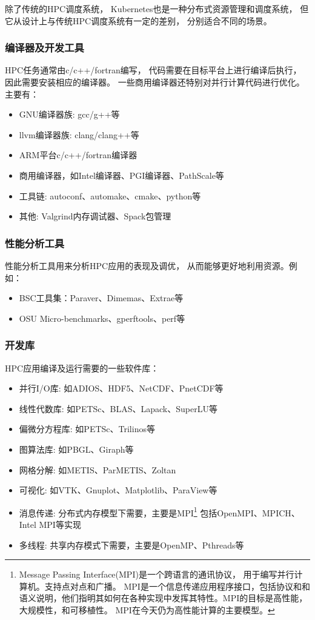 除了传统的HPC调度系统，
Kubernetes也是一种分布式资源管理和调度系统，
但它从设计上与传统HPC调度系统有一定的差别，
分别适合不同的场景\cite{choose_k8s_lsf}。

\subsubsection{编译器及开发工具}
HPC任务通常由c/c++/fortran编写，
代码需要在目标平台上进行编译后执行，
因此需要安装相应的编译器。
一些商用编译器还特别对并行计算代码进行优化。
主要有：

\begin{itemize}
    \item GNU编译器族: gcc/g++等
    \item llvm编译器族: clang/clang++等
    \item ARM平台c/c++/fortran编译器\cite{arm_hpc_tools}
    \item 商用编译器，如Intel编译器、PGI编译器、PathScale等 
    \item 工具链: autoconf、automake、cmake、python等 
    \item 其他: Valgrind内存调试器、Spack包管理
\end{itemize}

\subsubsection{性能分析工具}
性能分析工具用来分析HPC应用的表现及调优，
从而能够更好地利用资源。例如：

\begin{itemize}
    \item BSC工具集：Paraver、Dimemas、Extrae等
    \item OSU Micro-benchmarks、gperftools、perf等
\end{itemize}

\subsubsection{开发库}
HPC应用编译及运行需要的一些软件库：

\begin{itemize}
    \item 并行I/O库: 如ADIOS、HDF5、NetCDF、PnetCDF等
    \item 线性代数库: 如PETSc、BLAS、Lapack、SuperLU等
    \item 偏微分方程库: 如PETSc、Trilinos等
    \item 图算法库: 如PBGL、Giraph等
    \item 网格分解: 如METIS、ParMETIS、Zoltan
    \item 可视化: 如VTK、Gnuplot、Matplotlib、ParaView等
    \item 消息传递: 分布式内存模型下需要，主要是MPI\footnote{Message Passing Interface(MPI)是一个跨语言的通讯协议，
    用于编写并行计算机。支持点对点和广播。
    MPI是一个信息传递应用程序接口，包括协议和和语义说明，他们指明其如何在各种实现中发挥其特性。MPI的目标是高性能，大规模性，和可移植性。
    MPI在今天仍为高性能计算的主要模型\cite{wiki_mpi}。}
    包括OpenMPI、MPICH、Intel MPI等实现
    \item 多线程: 共享内存模式下需要，主要是OpenMP、Pthreads等
\end{itemize}

